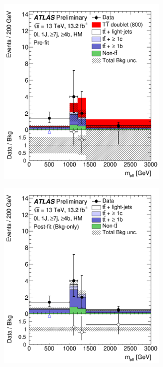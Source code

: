 \begin{figure}[p!]
\begin{subfigure}{0.24\textwidth}
  \centering
  \includegraphics[width=0.9\textwidth]{figures/VLQ/fig_12a.png}
  \caption{}
  \label{}
\end{subfigure}
\begin{subfigure}{0.24\textwidth}
  \centering
  \includegraphics[width=0.9\textwidth]{figures/VLQ/fig_12b.png}

\end{subfigure}
\end{figure}
